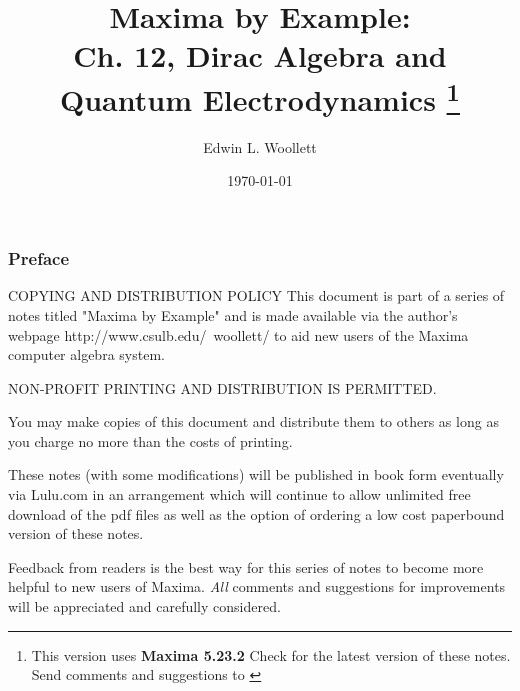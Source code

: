 \documentclass[11pt]{article}
\title{Maxima by Example:\\ Ch. 12, Dirac Algebra and Quantum Electrodynamics
             \thanks{This version uses \textbf{Maxima 5.23.2} \;
			 Check \; \textbf{ \tedhome } \; for the latest version of these notes. Send comments and
			 suggestions to \textbf{\tedmail} } }
\author{Edwin L. Woollett}
\date{\today}
\newcommand{\tcdb}{\textcolor{mdb}}
\newcommand{\tcbr}{\textcolor{BrickRed}}
\begin{document}
\maketitle
\tableofcontents
{}
\newpage
\subsubsection*{Preface}
\begin{myVerbatim2s} 
COPYING AND DISTRIBUTION POLICY    
This document is part of a series of notes titled
"Maxima by Example" and is made available
via the author's webpage http://www.csulb.edu/~woollett/
to aid new users of the Maxima computer algebra system.	
	
NON-PROFIT PRINTING AND DISTRIBUTION IS PERMITTED.
	
You may make copies of this document and distribute them
to others as long as you charge no more than the costs of printing.	

These notes (with some modifications) will be published in book form
eventually via Lulu.com in an arrangement which will continue
to allow unlimited free download of the pdf files as well as the option
of ordering a low cost paperbound version of these notes.
\end{myVerbatim2s}	
\smallskip
\noindent \tcbr{Feedback from readers is the best way for this series of notes
  to become more helpful to new users of Maxima}.
\tcdb{\emph{All} comments and suggestions for improvements will be appreciated and
  carefully considered}.
\smallskip
{} 
\end{document}
